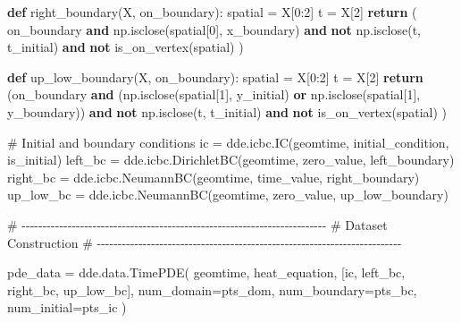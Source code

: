 \documentclass[
  spanish,
  us-letterpaper,
  DIV=11,
  numbers=noendperiod]{scrreprt}
\newenvironment{Shaded}{\begin{snugshade}}{\end{snugshade}}
\newcommand{\CommentTok}[1]{\textcolor[rgb]{0.37,0.37,0.37}{#1}}
\newcommand{\ControlFlowTok}[1]{\textcolor[rgb]{0.00,0.23,0.31}{\textbf{#1}}}
\newcommand{\DecValTok}[1]{\textcolor[rgb]{0.68,0.00,0.00}{#1}}
\newcommand{\KeywordTok}[1]{\textcolor[rgb]{0.00,0.23,0.31}{\textbf{#1}}}
\newcommand{\NormalTok}[1]{\textcolor[rgb]{0.00,0.23,0.31}{#1}}
\newcommand{\OperatorTok}[1]{\textcolor[rgb]{0.37,0.37,0.37}{#1}}
\theoremstyle{plain}
\theoremstyle{definition}
\theoremstyle{remark}
\begin{document}
\begin{Shaded}
\begin{Highlighting}[]
\KeywordTok{def}\NormalTok{ right\_boundary(X, on\_boundary):}
\NormalTok{    spatial }\OperatorTok{=}\NormalTok{ X[}\DecValTok{0}\NormalTok{:}\DecValTok{2}\NormalTok{]}
\NormalTok{    t }\OperatorTok{=}\NormalTok{ X[}\DecValTok{2}\NormalTok{]}
    \ControlFlowTok{return}\NormalTok{ (}
\NormalTok{        on\_boundary }
        \KeywordTok{and}\NormalTok{ np.isclose(spatial[}\DecValTok{0}\NormalTok{], x\_boundary) }
        \KeywordTok{and} \KeywordTok{not}\NormalTok{ np.isclose(t, t\_initial) }
        \KeywordTok{and} \KeywordTok{not}\NormalTok{ is\_on\_vertex(spatial)}
\NormalTok{    )}

\KeywordTok{def}\NormalTok{ up\_low\_boundary(X, on\_boundary):}
\NormalTok{    spatial }\OperatorTok{=}\NormalTok{ X[}\DecValTok{0}\NormalTok{:}\DecValTok{2}\NormalTok{]}
\NormalTok{    t }\OperatorTok{=}\NormalTok{ X[}\DecValTok{2}\NormalTok{]}
    \ControlFlowTok{return}\NormalTok{ (on\_boundary }
    \KeywordTok{and}\NormalTok{ (np.isclose(spatial[}\DecValTok{1}\NormalTok{], y\_initial) }
    \KeywordTok{or}\NormalTok{ np.isclose(spatial[}\DecValTok{1}\NormalTok{], y\_boundary)) }
    \KeywordTok{and} \KeywordTok{not}\NormalTok{ np.isclose(t, t\_initial) }
    \KeywordTok{and} \KeywordTok{not}\NormalTok{ is\_on\_vertex(spatial)}
\NormalTok{    )}

\CommentTok{\# Initial and boundary conditions}
\NormalTok{ic }\OperatorTok{=}\NormalTok{ dde.icbc.IC(geomtime, initial\_condition, is\_initial)}
\NormalTok{left\_bc }\OperatorTok{=}\NormalTok{ dde.icbc.DirichletBC(geomtime, }
\NormalTok{                                zero\_value, left\_boundary)}
\NormalTok{right\_bc }\OperatorTok{=}\NormalTok{ dde.icbc.NeumannBC(geomtime,}
\NormalTok{                                time\_value, right\_boundary)}
\NormalTok{up\_low\_bc }\OperatorTok{=}\NormalTok{ dde.icbc.NeumannBC(geomtime, }
\NormalTok{                                zero\_value, up\_low\_boundary)}

\CommentTok{\# {-}{-}{-}{-}{-}{-}{-}{-}{-}{-}{-}{-}{-}{-}{-}{-}{-}{-}{-}{-}{-}{-}{-}{-}{-}{-}{-}{-}{-}{-}{-}{-}{-}{-}{-}{-}{-}{-}{-}{-}{-}{-}{-}{-}{-}{-}{-}{-}{-}{-}{-}{-}{-}{-}{-}{-}{-}{-}{-}{-}{-}{-}{-}{-}{-}{-}{-}{-}{-}{-}{-}{-}{-}}
\CommentTok{\# Dataset Construction}
\CommentTok{\# {-}{-}{-}{-}{-}{-}{-}{-}{-}{-}{-}{-}{-}{-}{-}{-}{-}{-}{-}{-}{-}{-}{-}{-}{-}{-}{-}{-}{-}{-}{-}{-}{-}{-}{-}{-}{-}{-}{-}{-}{-}{-}{-}{-}{-}{-}{-}{-}{-}{-}{-}{-}{-}{-}{-}{-}{-}{-}{-}{-}{-}{-}{-}{-}{-}{-}{-}{-}{-}{-}{-}{-}{-}}

\NormalTok{pde\_data }\OperatorTok{=}\NormalTok{ dde.data.TimePDE(}
\NormalTok{    geomtime,}
\NormalTok{    heat\_equation,}
\NormalTok{    [ic, left\_bc, right\_bc, up\_low\_bc],}
\NormalTok{    num\_domain}\OperatorTok{=}\NormalTok{pts\_dom,}
\NormalTok{    num\_boundary}\OperatorTok{=}\NormalTok{pts\_bc,}
\NormalTok{    num\_initial}\OperatorTok{=}\NormalTok{pts\_ic }
\NormalTok{)}


\end{Highlighting}
\end{Shaded}
\end{document}
